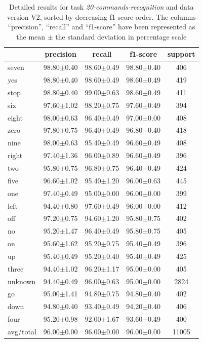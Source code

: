 \documentclass[review]{elsarticle}
\begin{document}
\begin{table} \centering \scriptsize
	\caption{Detailed results for task \textit{20-commands-recognition} and data version V2, sorted by decreasing f1-score order. The columns ``precision'', ``recall'' and ``f1-score'' have been represented as the mean $\pm$ the standard deviation in percentage scale }
	\begin{tabular}{lcccc}
		\toprule
		{} &       precision &          recall &        f1-score & support \\
		\midrule
		seven     &  98.80$\pm$0.40 &  98.60$\pm$0.49 &  98.80$\pm$0.40 &     406 \\
		yes       &  98.80$\pm$0.40 &  98.60$\pm$0.49 &  98.60$\pm$0.49 &     419 \\
		stop      &  98.80$\pm$0.40 &  99.00$\pm$0.63 &  98.60$\pm$0.49 &     411 \\
		six       &  97.60$\pm$1.02 &  98.20$\pm$0.75 &  97.60$\pm$0.49 &     394 \\
		eight     &  98.00$\pm$0.63 &  96.40$\pm$0.49 &  97.00$\pm$0.00 &     408 \\
		zero      &  97.80$\pm$0.75 &  96.40$\pm$0.49 &  96.80$\pm$0.40 &     418 \\
		nine      &  98.00$\pm$0.63 &  95.40$\pm$0.49 &  96.60$\pm$0.49 &     408 \\
		right     &  97.40$\pm$1.36 &  96.00$\pm$0.89 &  96.60$\pm$0.49 &     396 \\
		two       &  95.80$\pm$0.75 &  96.80$\pm$0.75 &  96.40$\pm$0.49 &     424 \\
		five      &  96.60$\pm$1.02 &  95.40$\pm$1.20 &  96.00$\pm$0.63 &     445 \\
		one       &  97.40$\pm$0.49 &  95.00$\pm$0.00 &  96.00$\pm$0.00 &     399 \\
		left      &  94.40$\pm$0.80 &  97.60$\pm$0.49 &  96.00$\pm$0.00 &     412 \\
		off       &  97.20$\pm$0.75 &  94.60$\pm$1.20 &  95.80$\pm$0.75 &     402 \\
		no        &  95.20$\pm$1.47 &  96.40$\pm$0.49 &  95.80$\pm$0.75 &     405 \\
		on        &  95.60$\pm$1.62 &  95.20$\pm$0.75 &  95.40$\pm$0.49 &     396 \\
		up        &  95.40$\pm$0.49 &  95.20$\pm$0.40 &  95.40$\pm$0.49 &     425 \\
		three     &  94.40$\pm$1.02 &  96.20$\pm$1.17 &  95.00$\pm$0.00 &     405 \\
		unknown   &  94.40$\pm$0.49 &  96.00$\pm$0.63 &  95.00$\pm$0.00 &    2824 \\
		go        &  95.00$\pm$1.41 &  94.80$\pm$0.75 &  94.80$\pm$0.40 &     402 \\
		down      &  94.80$\pm$0.40 &  93.40$\pm$0.49 &  94.20$\pm$0.40 &     406 \\
		four      &  95.20$\pm$0.98 &  92.00$\pm$1.67 &  93.60$\pm$0.49 &     400 \\
		\midrule avg/total &  96.00$\pm$0.00 &  96.00$\pm$0.00 &  96.00$\pm$0.00 &   11005 \\
		\bottomrule
	\end{tabular}
	

\end{table}
\end{document}
